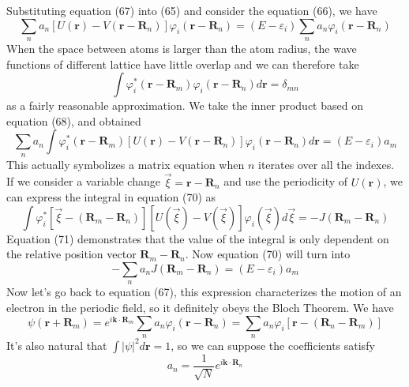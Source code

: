 \documentclass{article}
\begin{document}
Substituting equation (67) into (65) and consider the equation (66), we have\begin{equation}
    \sum_n{a_n}[U(\mathbf{r})-V(\mathbf{r}-\mathbf{R}_n)]\varphi_i(\mathbf{r}-\mathbf{R}_n)=(E-\varepsilon_i)\sum_n{a_n}\varphi_i(\mathbf{r}-\mathbf{R}_n)
\end{equation}
When the space between atoms is larger than the atom radius, the wave functions of different lattice have little overlap and we can therefore take\begin{equation}
    \int\varphi_i^*(\mathbf{r}-\mathbf{R}_m)\varphi_i(\mathbf{r}-\mathbf{R}_n)d\mathbf{r}=\delta_{mn}
\end{equation}
as a fairly reasonable approximation. We take the inner product based on equation (68), and obtained\begin{equation}
    \sum_n{a_n}\int\varphi_i^*(\mathbf{r}-\mathbf{R}_m)[U(\mathbf{r})-V(\mathbf{r}-\mathbf{R}_n)]\varphi_i(\mathbf{r}-\mathbf{R}_n)d\mathbf{r}=(E-\varepsilon_i)a_m
\end{equation}
This actually symbolizes a matrix equation when $n$ iterates over all the indexes. If we consider a variable change $\vec\xi=\mathbf{r}-\mathbf{R}_n$ and use the periodicity of $U(\mathbf{r})$, we can express the integral in equation (70) as\begin{equation}
    \int\varphi_i^*[\vec\xi-(\mathbf{R}_m-\mathbf{R}_n)][U(\vec\xi)-V(\vec\xi)]\varphi_i(\vec\xi)d\vec\xi=-J(\mathbf{R}_m-\mathbf{R}_n)
\end{equation}
Equation (71) demonstrates that the value of the integral is only dependent on the relative position vector $\mathbf{R}_m-\mathbf{R}_n$. Now equation (70) will turn into\begin{equation}
    -\sum_n{a_n}J(\mathbf{R}_m-\mathbf{R}_n)=(E-\varepsilon_i)a_m
\end{equation}
Now let's go back to equation (67), this expression characterizes the motion of an electron in the periodic field, so it definitely obeys the Bloch Theorem. We have\begin{equation}
    \psi(\mathbf{r}+\mathbf{R}_m)=e^{i\mathbf{k}\cdot\mathbf{R}_m}\sum_n{a_n}\varphi_i(\mathbf{r}-\mathbf{R}_n)=\sum_n{a_n}\varphi_i[\mathbf{r}-(\mathbf{R}_n-\mathbf{R}_m)]
\end{equation}
It's also natural that $\int|\psi|^2d\mathbf{r}=1$, so we can suppose the coefficients satisfy\begin{equation}
    a_n=\frac{1}{\sqrt{N}}e^{i\mathbf{k}\cdot\mathbf{R}_n}
\end{equation}
\end{document}
